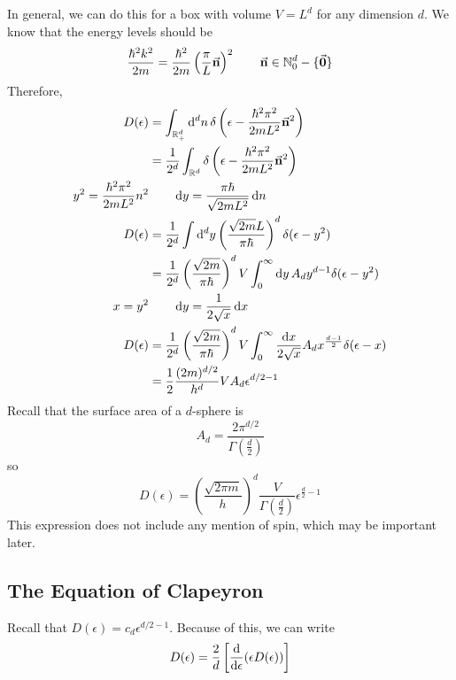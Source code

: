 \documentclass[a4paper,twoside,master.tex]{subfiles}
\begin{document}
In general, we can do this for a box with volume $ V = L^d $ for any dimension $ d $. We know that the energy levels should be
\begin{equation}
    \frac{\hbar^2 k^2}{2m} = \frac{\hbar^2}{2m} \left( \frac{\pi}{L} \va{n} \right)^2 \qquad \va{n} \in \mathbb{N}_0^d - \{\va{0}\}
\end{equation}
Therefore,
\begin{align}
    D(\epsilon) &= \int_{\mathbb{R}_+^d} \dd[d]{n} \delta\left( \epsilon - \frac{\hbar^2 \pi^2}{2mL^2} \va{n}^2 \right) \\
    &= \frac{1}{2^d} \int_{\mathbb{R}^d} \delta\left( \epsilon - \frac{\hbar^2 \pi^2}{2mL^2} \va{n}^2 \right) \\
    y^2 = \frac{\hbar^2 \pi^2}{2mL^2} n^2 &\qquad \dd{y} = \frac{\pi \hbar}{\sqrt{2mL^2}} \dd{n} \\
    D(\epsilon) &= \frac{1}{2^d} \int \dd[d]{y} \left( \frac{\sqrt{2m} L}{\pi \hbar} \right)^d \delta(\epsilon - y^2) \\
    &= \frac{1}{2^d} \left( \frac{\sqrt{2m}}{\pi \hbar} \right)^d V \int_0^{\infty} \dd{y} A_d y^{d-1} \delta(\epsilon - y^2) \\
    x = y^2 &\qquad \dd{y} = \frac{1}{2 \sqrt{x}} \dd{x} \\
    D(\epsilon) &= \frac{1}{2^d} \left( \frac{\sqrt{2m}}{\pi \hbar} \right)^d V \int_0^{\infty} \frac{\dd{x}}{2 \sqrt{x}} A_d x^{\frac{d - 1}{2}} \delta(\epsilon - x) \\
    &= \frac{1}{2} \frac{(2m)^{d/2}}{h^d} V A_d \epsilon^{d/2 - 1}
\end{align}
Recall that the surface area of a $ d $-sphere is
\begin{equation}
    A_d = \frac{2 \pi^{d/2}}{\Gamma\left( \frac{d}{2} \right)}
\end{equation}
so
\begin{equation}
    D(\epsilon) = \left( \frac{\sqrt{2 \pi m}}{h} \right)^d \frac{V}{\Gamma \left( \frac{d}{2} \right)} \epsilon^{\frac{d}{2}-1}
\end{equation}
This expression does not include any mention of spin, which may be important later.


\subsection{The Equation of Clapeyron}
\label{sub:the_equation_of_clapeyron}

Recall that $ D(\epsilon) = c_d \epsilon^{d/2 - 1} $. Because of this, we can write
\begin{equation}
    D(\epsilon) = \frac{2}{d} \left[ \dv{\epsilon}(\epsilon D(\epsilon)) \right]
\end{equation}
\end{document}
